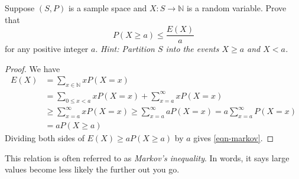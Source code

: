 \documentclass{article}
\theoremstyle{definition}
\begin{document}
\begin{question}
    Suppose $(S,P)$ is a sample space and $X \colon S \to \mathbb{N}$ is a
    random variable.  Prove that
    \begin{equation}
        P(X \geq a) \leq \frac{E(X)}{a} \label{eqn-markov}
    \end{equation}
    for any positive integer $a$. 
    \textit{Hint: Partition $S$ into the events $X \geq a$ and $X < a$.}
\end{question}
\begin{solution}
\begin{proof}
    We have
    \begin{align*}
        E(X) &= \sum_{x \in \mathbb{N}} x P(X=x)
           \\&= \sum_{0 \leq x < a} x P(X=x) + \sum_{x = a}^\infty x P(X=x)
           \\&\geq \sum_{x = a}^\infty x P(X=x)
             \geq \sum_{x = a}^\infty a P(X=x) = a \sum_{x = a}^\infty  P(X=x)
           \\&= a P(X\geq a)
    \end{align*}
    Dividing both sides of $E(X) \geq a P(X \geq a)$ by $a$ gives \eqref{eqn-markov}.
\end{proof}
This relation is often referred to as \emph{Markov's inequality}.  In words, it
says large values become less likely the further out you go.
\end{solution}
\end{document}
